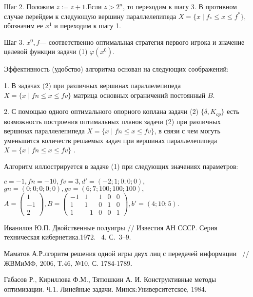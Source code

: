 Шаг 2. Положим $z:=z+1$.Если $z>2^n$, то переходим к шагу 3. В противном случае перейдем к следующую вершину параллелепипеда $X=\{x\mid f_*\leq x \leq f^*\} $, обозначим ее $x^1$ и переходим к шагу 1.

Шаг 3. $x^0, f$--- соответственно оптимальная стратегия первого игрока и значение целевой функции задачи (1) $\varphi(x^0).$

Эффективность (удобство) алгоритма основан на следующих соображений:

1. В задачах (2) при различных вершинах параллелепипеда $X=\{x\mid fn \leq x \leq fv \}$ матрица основных ограничений постоянный $B$.

2. С помощью одного оптимального опорного коплана задачи (2) $\{\delta,K_{op}\}$ есть возможность построения оптимальных планов задачи (2) при различных вершинах параллелепипеда $X=\{x\mid fn \leq x \leq fv \}$,  в связи с чем могуть уменьшится количеств решаемых задач при вершинах параллелепипеда $X=\{x\mid fn \leq x \leq fv \}$ .

Алгоритм иллюстрируется в задаче (1) при следующих значениях параметров:

\begin{math}c=-1,fn=-10, fv=3,d'=(-2;1;0;0;0),\end{math}
\begin{math}gn=(0;0;0;0;0),gv=(6;7;100;100;100),\end{math}
\begin{math} A=
\left(
\begin {array}{c}
1\\
-1\\
2
\end{array}
\right), B= \left(
\begin {array}{ccccc}
-1& 1& 1& 0& 0\\
1& 1& 0& 1& 0\\
1& -1& 0& 0& 1
\end{array}
\right), b'=(4;10;5).
\end{math}
\begin{thebibliography}{9} %

 Иванилов Ю.П. Двойственные полуигры // Известия АН СССР. Серия
техническая кибернетика.1972. \textnumero~4. С.~3--9.

 Маматов А.Р.лгоритм решения одной игры двух лиц
с передачей информации ~// ЖВМиМФ, 2006, Т.46, №10, С. 1784-1789.

 Габасов Р., Кириллова Ф.М., Тятюшкин А. И. Конструктивные
методы оптимизации. Ч.1. Линейные задачи. Минск:Университетское, 1984.


\end{thebibliography}





%

